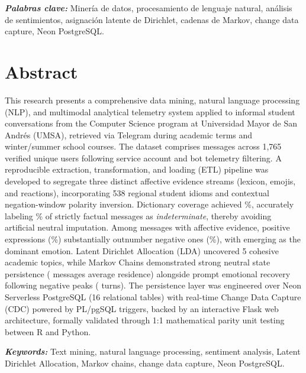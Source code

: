 \documentclass[12pt,letterpaper]{article}
\begin{document}
\vspace{0.8em}
\noindent
\textbf{\textit{Palabras clave:}} Minería de datos, procesamiento de lenguaje natural, análisis de sentimientos, asignación latente de Dirichlet, cadenas de Markov, change data capture, Neon PostgreSQL.

\vspace{1.5cm}

\section*{Abstract}

\noindent
This research presents a comprehensive data mining, natural language processing (NLP), and multimodal analytical telemetry system applied to informal student conversations from the Computer Science program at Universidad Mayor de San Andrés (UMSA), retrieved via Telegram during academic terms and winter/summer school courses. The dataset comprises \nMensajes{} messages across 1,765 verified unique users following service account and bot telemetry filtering. A reproducible extraction, transformation, and loading (ETL) pipeline was developed to segregate three distinct affective evidence streams (lexicon, emojis, and reactions), incorporating 538 regional student idioms and contextual negation-window polarity inversion. Dictionary coverage achieved \pctCobertura{}\%, accurately labeling \pctIndeterminado{}\% of strictly factual messages as \emph{indeterminate}, thereby avoiding artificial neutral imputation. Among messages with affective evidence, positive expressions (\pctPositivos{}\%) substantially outnumber negative ones (\pctNegativos{}\%), with \emph{\emocionTop{}} emerging as the dominant emotion. Latent Dirichlet Allocation (LDA) uncovered 5 cohesive academic topics, while Markov Chains demonstrated strong neutral state persistence (\permanenciaNeutro{} messages average residence) alongside prompt emotional recovery following negative peaks (\recuperacionNegativa{} turns). The persistence layer was engineered over Neon Serverless PostgreSQL (16 relational tables) with real-time Change Data Capture (CDC) powered by PL/pgSQL triggers, backed by an interactive Flask web architecture, formally validated through 1:1 mathematical parity unit testing between R and Python.

\vspace{0.8em}
\noindent
\textbf{\textit{Keywords:}} Text mining, natural language processing, sentiment analysis, Latent Dirichlet Allocation, Markov chains, change data capture, Neon PostgreSQL.
\end{document}
